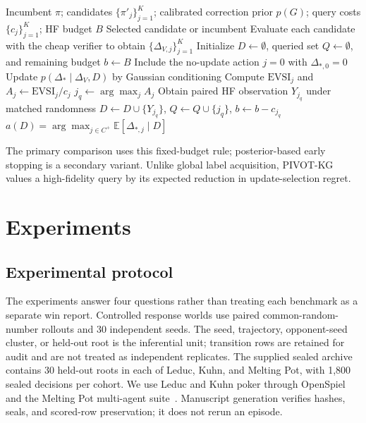 \documentclass{article}
\newcommand{\E}{\mathbb{E}}
\begin{document}
\begin{algorithm}[t]
\caption{PIVOT-KG under a fixed high-fidelity budget}
\label{alg:pivot-kg}
\begin{algorithmic}[1]
\REQUIRE Incumbent $\pi$; candidates $\{\pi'_j\}_{j=1}^K$;
calibrated correction prior $p(G)$; query costs $\{c_j\}_{j=1}^K$;
HF budget $B$
\ENSURE Selected candidate or incumbent
\STATE Evaluate each candidate with the cheap verifier to obtain
$\{\Delta_{V,j}\}_{j=1}^K$
\STATE Initialize $D\leftarrow\emptyset$, queried set
$Q\leftarrow\emptyset$, and remaining budget $b\leftarrow B$
\STATE Include the no-update action $j=0$ with $\Delta_{*,0}=0$
  \STATE Update $p(\Delta_*\mid\Delta_V,D)$ by Gaussian conditioning
    \STATE Compute $\mathrm{EVSI}_j$ and
    $A_j\leftarrow\mathrm{EVSI}_j/c_j$
  \ENDFOR
  \STATE $j_q\leftarrow\arg\max_j A_j$
  \STATE Obtain paired HF observation $Y_{j_q}$ under matched randomness
  \STATE $D\leftarrow D\cup\{Y_{j_q}\}$,
         $Q\leftarrow Q\cup\{j_q\}$,
         $b\leftarrow b-c_{j_q}$
\ENDWHILE
\STATE \RETURN
$\displaystyle a(D)=\arg\max_{j\in C^+}\E[\Delta_{*,j}\mid D]$
\end{algorithmic}
\end{algorithm}

The primary comparison uses this fixed-budget rule; posterior-based early
stopping is a secondary variant. Unlike global label acquisition, PIVOT-KG
values a high-fidelity query by its expected reduction in update-selection
regret.

\section{Experiments}
\subsection{Experimental protocol}
The experiments answer four questions rather than treating each benchmark as a
separate win report. Controlled response worlds use paired common-random-number
rollouts and 30 independent seeds. The seed, trajectory, opponent-seed cluster,
or held-out root is the inferential unit; transition rows are retained for audit
and are not treated as independent replicates. The supplied sealed archive
contains 30 held-out roots in each of Leduc, Kuhn, and Melting Pot, with 1,800
sealed decisions per cohort. We use Leduc and Kuhn poker through
OpenSpiel~\cite{lanctot2019openspiel} and the Melting Pot multi-agent
suite~\cite{leibo2021meltingpot}. Manuscript generation verifies hashes, seals,
and scored-row preservation; it does not rerun an episode.
\end{document}
